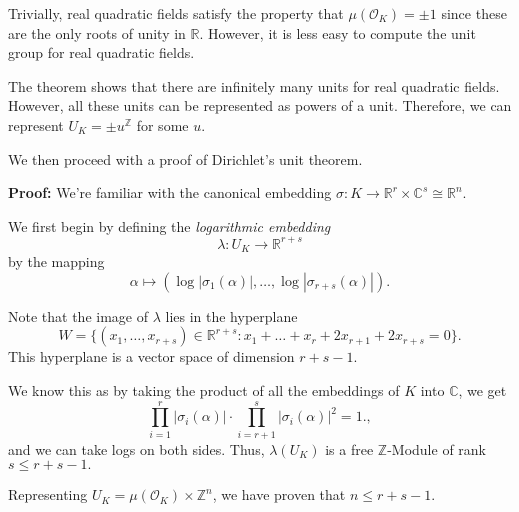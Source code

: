 \documentclass[a4paper, 12pt,oneside,openany]{book}
\begin{document}
Trivially, real quadratic fields satisfy the property that $\mu(\mathcal{O}_K)=\pm 1$ since these are the only roots of unity in $\mathbb{R}.$ However, it is less easy to compute the unit group for real quadratic fields.

The theorem shows that there are infinitely many units for real quadratic fields. However, all these units can be represented as powers of a unit. Therefore, we can represent $U_K=\pm u^{\mathbb{Z}}$ for some $u.$



We then proceed with a proof of Dirichlet's unit theorem. 

\textbf{Proof:} We're familiar with the canonical embedding $\sigma: K \to \mathbb{R}^r \times \mathbb{C}^s \cong \mathbb{R}^n.$

We first begin by defining the \emph{logarithmic embedding} $$\lambda: U_K \to \mathbb{R}^{r+s}$$ by the mapping $$\alpha \mapsto (\log |\sigma_{1}(\alpha)|, \dots, \log |\sigma_{r+s}(\alpha)|).$$

Note that the image of $\lambda$ lies in the hyperplane $$W=\{(x_1, \dots, x_{r+s}) \in \mathbb{R}^{r+s}: x_1+\dots+x_r+2x_{r+1}+2x_{r+s}=0\}.$$ This hyperplane is a vector space of dimension $r+s-1.$ 

We know this as by taking the product of all the embeddings of $K$ into $\mathbb{C}$, we get $$\prod\limits_{i=1}^r |\sigma_i(\alpha)| \cdot \prod\limits_{i=r+1}^s |\sigma_i(\alpha)|^2 = 1.,$$ and we can take logs on both sides. Thus, $\lambda(U_K)$ is a free $\mathbb{Z}$-Module of rank $s \leq r+s-1.$

Representing $U_K = \mu(\mathcal{O}_K) \times \mathbb{Z}^n$, we have proven that $n \leq r+s-1.$
\end{document}
